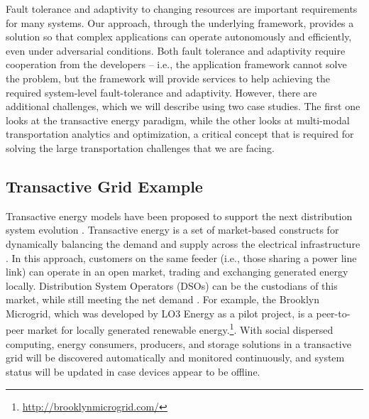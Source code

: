 \documentclass[12pt,letterpaper]{article}
\newcommand{\Aron}[1]{\todo[color=green!40, linecolor=black!50]{\textbf{Aron}: #1}}
\begin{document}
Fault tolerance and adaptivity to changing resources are important requirements for many systems. Our approach, through the underlying framework, provides a solution so that complex applications can operate autonomously and efficiently, even under adversarial conditions. Both fault tolerance and adaptivity require cooperation from the developers -- i.e., the application framework cannot solve the problem, but the framework will provide services to help achieving the required system-level fault-tolerance and adaptivity.  However, there are additional challenges, which we will describe using two case studies. The first one looks at the transactive energy paradigm, while the other looks at multi-modal transportation analytics and optimization, a critical concept that is required for solving the large transportation challenges that we are facing. 

\subsection{Transactive Grid Example}

Transactive energy models have
been proposed to support the next distribution system evolution
\cite{kok2016society,cox2013structured,melton2013gridwise}. Transactive
energy is a set of market-based constructs for dynamically balancing
the demand and supply across the electrical infrastructure
\cite{melton2013gridwise}. In this approach, customers on the same
feeder (i.e., those sharing a power line link) can operate in an
open market, trading and exchanging generated energy
locally. Distribution System Operators (DSOs) can be the custodians of
this market, while still meeting the net demand \cite{7462854}. For
example, the Brooklyn Microgrid, which was developed by LO3 Energy as
a pilot project, is a peer-to-peer market for locally generated
renewable energy.\footnote{\url{http://brooklynmicrogrid.com/}}.
With social dispersed computing, energy consumers, producers, and storage solutions in a transactive grid will be discovered automatically and monitored continuously, and system status will be updated in case devices appear to be offline. 
\end{document}
